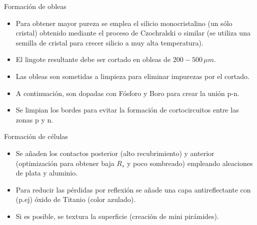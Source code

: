 \documentclass[xcolor={usenames,svgnames,dvipsnames}]{beamer}
\begin{document}
\begin{frame}[label=sec-4-0-3]{Formación de obleas}
\begin{itemize}
\item Para obtener mayor pureza se emplea el silicio monocristalino (un sólo cristal) obtenido mediante el proceso de Czochralski o similar (se utiliza una semilla de cristal para crecer silicio a muy alta temperatura).

\item El lingote resultante debe ser cortado en obleas de $200-500\,\mu m$.

\item Las obleas son sometidas a limpieza para eliminar impurezas por el cortado.

\item A continuación, son dopadas con Fósforo y Boro para crear la unión p-n.

\item Se limpian los bordes para evitar la formación de cortocircuitos entre las zonas p y n.
\end{itemize}
\end{frame}

\begin{frame}[label=sec-4-0-4]{Formación de células}
\begin{itemize}
\item Se añaden los contactos posterior (alto recubrimiento) y anterior (optimización para obtener baja $R_{s}$ y poco sombreado) empleando aleaciones de plata y aluminio.

\item Para reducir las pérdidas por reflexión se añade una capa antireflectante con (p.ej) óxido de Titanio (color azulado).

\item Si es posible, se textura la superficie (creación de mini pirámides).
\end{itemize}
\end{frame}
\end{document}
